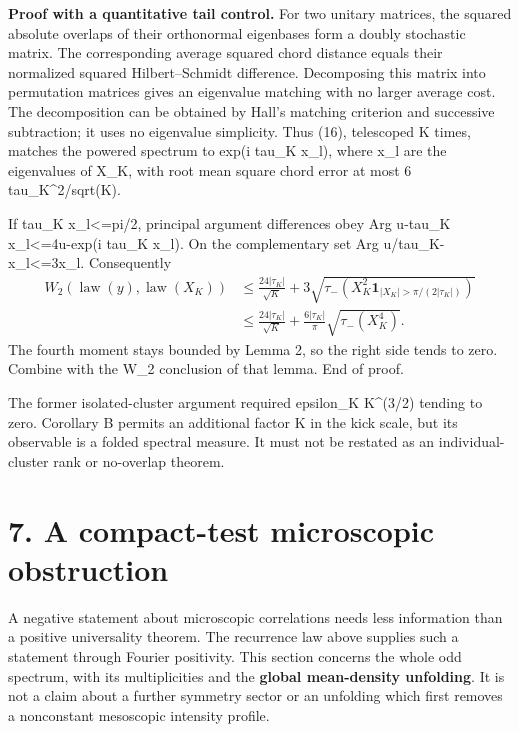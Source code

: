 \documentclass[11pt,a4paper]{article}
\begin{document}
\textbf{Proof with a quantitative tail control.} For two unitary matrices, the squared absolute overlaps of their orthonormal eigenbases form a doubly stochastic matrix. The corresponding average squared chord distance equals their normalized squared Hilbert--Schmidt difference. Decomposing this matrix into permutation matrices gives an eigenvalue matching with no larger average cost. The decomposition can be obtained by Hall's matching criterion and successive subtraction; it uses no eigenvalue simplicity. Thus (16), telescoped K times, matches the powered spectrum to exp(i tau\_K x\_l), where x\_l are the eigenvalues of X\_K, with root mean square chord error at most 6 tau\_K\^{}2/sqrt(K).

If \textbar tau\_K x\_l\textbar\textless=pi/2, principal argument differences obey \textbar Arg u-tau\_K x\_l\textbar\textless=4\textbar u-exp(i tau\_K x\_l)\textbar. On the complementary set \textbar Arg u/tau\_K-x\_l\textbar\textless=3\textbar x\_l\textbar. Consequently \[
 \begin{split}
 W_2(\operatorname{law}(y),\operatorname{law}(X_K))
 &\leq\frac{24|\tau_K|}{\sqrt K}
   +3\sqrt{\tau_-\!\left(X_K^2
       \mathbf1_{|X_K|>\pi/(2|\tau_K|)}\right)}\\
 &\leq\frac{24|\tau_K|}{\sqrt K}
       +\frac{6|\tau_K|}{\pi}\sqrt{\tau_-(X_K^4)}.
 \end{split}\tag{22}
\] The fourth moment stays bounded by Lemma 2, so the right side tends to zero. Combine with the W\_2 conclusion of that lemma. End of proof.

The former isolated-cluster argument required epsilon\_K K\^{}(3/2) tending to zero. Corollary B permits an additional factor K in the kick scale, but its observable is a folded spectral measure. It must not be restated as an individual-cluster rank or no-overlap theorem.

\hypertarget{a-compact-test-microscopic-obstruction}{%
\section{7. A compact-test microscopic obstruction}\label{a-compact-test-microscopic-obstruction}}

A negative statement about microscopic correlations needs less information than a positive universality theorem. The recurrence law above supplies such a statement through Fourier positivity. This section concerns the whole odd spectrum, with its multiplicities and the \textbf{global mean-density unfolding}. It is not a claim about a further symmetry sector or an unfolding which first removes a nonconstant mesoscopic intensity profile.
\end{document}

